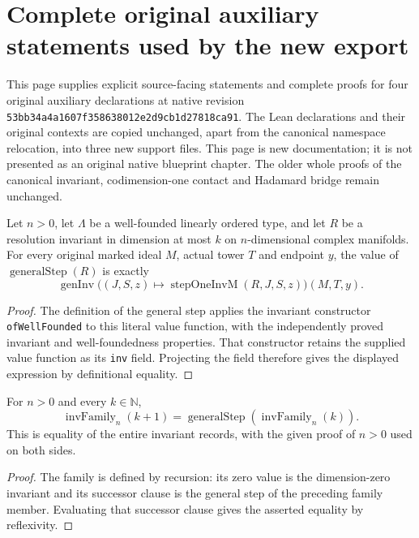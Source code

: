 \section{Complete original auxiliary statements used by the new export}

This page supplies explicit source-facing statements and complete proofs for
four original auxiliary declarations at native revision
\texttt{53bb34a4a1607f358638012e2d9cb1d27818ca91}. The Lean declarations and
their original contexts are copied unchanged, apart from the canonical
namespace relocation, into three new support files. This page is new
documentation; it is not presented as an original native blueprint chapter.
The older whole proofs of the canonical invariant, codimension-one contact
and Hadamard bridge remain unchanged.

\begin{lemma}
\label{pub:canonical-general-step-value}
\notready
Let $n>0$, let $\Lambda$ be a well-founded linearly ordered type, and let $R$
be a resolution invariant in dimension at most $k$ on $n$-dimensional complex
manifolds. For every original marked ideal $M$, actual tower $T$ and endpoint
$y$, the value of $\operatorname{generalStep}(R)$ is exactly
\[
 \operatorname{genInv}\bigl((J,S,z)\mapsto
       \operatorname{stepOneInvM}(R,J,S,z)\bigr)(M,T,y).
\]
\end{lemma}
\begin{proof}
The definition of the general step applies the invariant constructor
\texttt{ofWellFounded} to this literal value function, with the independently
proved invariant and well-foundedness properties. That constructor retains
the supplied value function as its \texttt{inv} field. Projecting the field
therefore gives the displayed expression by definitional equality.
\end{proof}

\begin{lemma}
\label{pub:canonical-invariant-successor}
\notready
For $n>0$ and every $k\in\mathbb N$,
\[
 \operatorname{invFamily}_n(k+1)
   =\operatorname{generalStep}(\operatorname{invFamily}_n(k)).
\]
This is equality of the entire invariant records, with the given proof of
$n>0$ used on both sides.
\end{lemma}
\begin{proof}
The family is defined by recursion: its zero value is the dimension-zero
invariant and its successor clause is the general step of the preceding
family member. Evaluating that successor clause gives the asserted equality
by reflexivity.
\end{proof}

